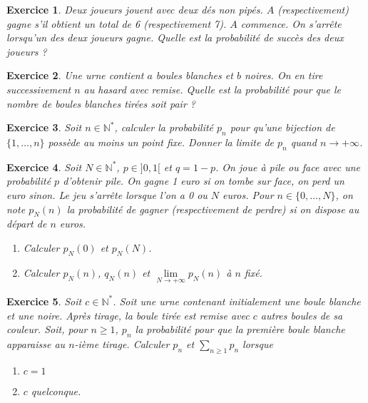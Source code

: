 \documentclass[12pt]{article}
\newtheorem{exercise}{Exercice}[section]
\theoremstyle{remark}
\theoremstyle{remark}
\newcommand{\N}{\mathbb{N}} \newcommand{\Z}{\mathbb{Z}}
\begin{document}
\begin{exercise}
	Deux joueurs jouent avec deux dés non pipés. $A$ (respectivement) gagne s'il
	obtient un total de 6 (respectivement 7). $A$ commence. On s'arrête lorsqu'un
	des deux joueurs gagne. Quelle est la probabilité de succès des deux joueurs ?
\end{exercise}

\begin{exercise}
	Une urne contient $a$ boules blanches et $b$ noires. On en tire successivement
	$n$ au hasard avec remise. Quelle est la probabilité pour que le nombre de
	boules blanches tirées soit pair ?
\end{exercise}

\begin{exercise}
	Soit $n\in\N^{*}$, calculer la probabilité $p_{n}$ pour qu'une bijection de
	$\{1,\dots,n\}$ possède au moins un point fixe. Donner la limite de $p_{n}$
	quand $n\to+\infty$.
\end{exercise}

\begin{exercise}
	Soit $N\in\N^{*}$, $p\in]0,1[$ et $q=1-p$. On joue à pile ou face avec une
	probabilité $p$ d'obtenir pile. On gagne 1 euro si on tombe sur face, on perd
	un euro sinon. Le jeu s'arrête lorsque l'on a 0 ou $N$ euros. Pour
	$n\in\{0,\dots,N\}$, on note $p_{N}(n)$ la probabilité de gagner
	(respectivement de perdre) si on dispose au départ de $n$ euros.
	\begin{enumerate}
		\item
		Calculer $p_{N}(0)$ et $p_{N}(N)$.
		\item
		Calculer $p_{N}(n)$, $q_{N}(n)$ et $\lim\limits_{N\to+\infty}p_{N}(n)$ à
		$n$ fixé.
	\end{enumerate}
\end{exercise}

\begin{exercise}
	Soit $c\in\N^{*}$. Soit une urne contenant initialement une boule blanche et
	une noire. Après tirage, la boule tirée est remise avec $c$ autres boules de
	sa couleur. Soit, pour $n\geqslant1$, $p_{n}$ la probabilité pour que la
	première boule blanche apparaisse au $n$-ième tirage. Calculer $p_{n}$ et
	$\sum_{n\geqslant1}p_{n}$ lorsque 
	\begin{enumerate}
		\item
		$c=1$
		\item
		$c$ quelconque.
	\end{enumerate}
\end{exercise}
\end{document}
